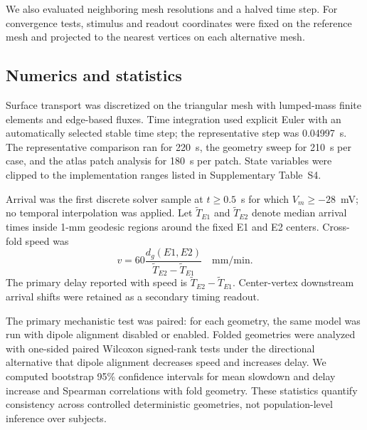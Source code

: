 \documentclass[12pt]{article}
\begin{document}
We also evaluated neighboring mesh resolutions and a halved time step. For convergence tests, stimulus and readout coordinates were fixed on the reference mesh and projected to the nearest vertices on each alternative mesh.

\subsection{Numerics and statistics}

Surface transport was discretized on the triangular mesh with lumped-mass finite elements and edge-based fluxes. Time integration used explicit Euler with an automatically selected stable time step; the representative step was 0.04997~s. The representative comparison ran for 220~s, the geometry sweep for 210~s per case, and the atlas patch analysis for 180~s per patch. State variables were clipped to the implementation ranges listed in Supplementary Table~S4.

Arrival was the first discrete solver sample at $t\ge0.5$~s for which $V_m\ge-28$~mV; no temporal interpolation was applied. Let $\widetilde T_{E1}$ and $\widetilde T_{E2}$ denote median arrival times inside 1-mm geodesic regions around the fixed E1 and E2 centers. Cross-fold speed was
\begin{equation}
v=60\frac{d_g(E1,E2)}{\widetilde T_{E2}-\widetilde T_{E1}}\quad\mathrm{mm/min}.
\end{equation}
The primary delay reported with speed is $\widetilde T_{E2}-\widetilde T_{E1}$. Center-vertex downstream arrival shifts were retained as a secondary timing readout.

The primary mechanistic test was paired: for each geometry, the same model was run with dipole alignment disabled or enabled. Folded geometries were analyzed with one-sided paired Wilcoxon signed-rank tests under the directional alternative that dipole alignment decreases speed and increases delay. We computed bootstrap 95\% confidence intervals for mean slowdown and delay increase and Spearman correlations with fold geometry. These statistics quantify consistency across controlled deterministic geometries, not population-level inference over subjects.
\end{document}
